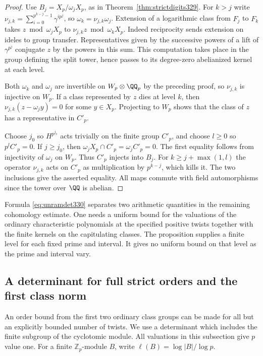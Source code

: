 \documentclass[a4paper,11pt]{article}
\theoremstyle{definition}
\theoremstyle{remark}
\newcommand{\ZZ}{\mathbb Z}\newcommand{\ord}{\operatorname{ord}}
\numberwithin{equation}{section}
\begin{document}
\begin{proof}
Use \(B_j=X_p/\omega_j X_p\), as in
Theorem~\ref{thm:strictdigits329}. For \(k>j\) write
\(\nu_{j,k}=\sum_{i=0}^{p^{k-j}-1}\gamma^{ip^j}\), so
\(\omega_k=\nu_{j,k}\omega_j\). Extension of a logarithmic
class from \(F_j\) to \(F_k\) takes \(z\bmod\omega_jX_p\) to
\(\nu_{j,k}z\bmod\omega_kX_p\). Indeed reciprocity sends
extension on ideles to group transfer. Representatives given
by the successive powers of a lift of \(\gamma^{p^j}\)
conjugate \(z\) by the powers in this sum. This computation
takes place in the group defining the split tower, hence passes
to its degree-zero abelianized kernel at each level.

Both \(\omega_k\) and \(\omega_j\) are invertible on
\(W_p\otimes\QQ_p\) by the preceding proof, so \(\nu_{j,k}\)
is injective on \(W_p\). If a class represented by \(z\) dies
at level \(k\), then \(\nu_{j,k}(z-\omega_j y)=0\) for some
\(y\in X_p\). Projecting to \(W_p\) shows that the class of
\(z\) has a representative in \(C'_p\).

Choose \(j_0\) so \(H^{p^{j_0}}\) acts trivially on the finite
group \(C'_p\), and choose \(l\ge0\) so \(p^l C'_p=0\).
If \(j\ge j_0\), then \(\omega_jX_p\cap C'_p=\omega_jC'_p=0\).
The first equality follows from injectivity of \(\omega_j\) on
\(W_p\). Thus \(C'_p\) injects into \(B_j\). For
\(k\ge j+\max(1,l)\) the operator \(\nu_{j,k}\) acts on \(C'_p\)
as multiplication by \(p^{k-j}\), which kills it. The two
inclusions give the asserted equality. All maps commute with
field automorphisms since the tower over \(\QQ\) is abelian.
\end{proof}

Formula \eqref{eq:unramdet330} separates two arithmetic quantities
in the remaining cohomology estimate. One needs a uniform bound
for the valuations of the ordinary characteristic polynomials at
the specified positive twists together with the finite kernels on
the capitulating classes. The proposition supplies a finite level
for each fixed prime and interval. It gives no uniform bound on
that level as the prime and interval vary.


\subsection{A determinant for full strict orders and the first class norm}\label{sec:normsample340}
An order bound from the first two ordinary class groups can be made for
all but an explicitly bounded number of twists. We use a determinant
which includes the finite subgroup of the cyclotomic module. All
valuations in this subsection give $p$ value one. For a finite
$\ZZ_p$-module $B$, write $\ell(B)=\log |B|/\log p$.
\end{document}
